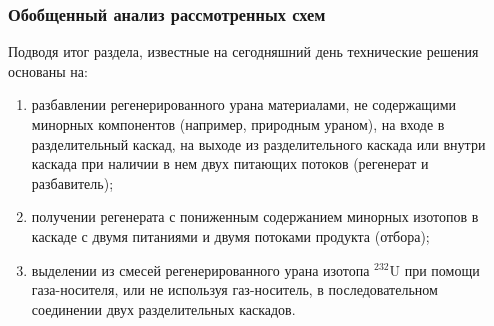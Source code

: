 \subsubsection{Обобщенный анализ рассмотренных схем}

Подводя итог раздела, известные на сегодняшний день технические решения основаны на:
\begin{enumerate}
  \item разбавлении регенерированного урана материалами, не содержащими минорных компонентов (например, природным ураном), на входе в разделительный каскад, на выходе из разделительного каскада или внутри каскада при наличии в нем двух питающих потоков (регенерат и разбавитель);
  \item получении регенерата с пониженным содержанием минорных изотопов в каскаде с двумя питаниями и двумя потоками продукта (отбора);
  \item выделении из смесей регенерированного урана изотопа $^{232}$U при помощи газа-носителя, или не используя газ-носитель, в последовательном соединении двух разделительных каскадов.
\end{enumerate}



